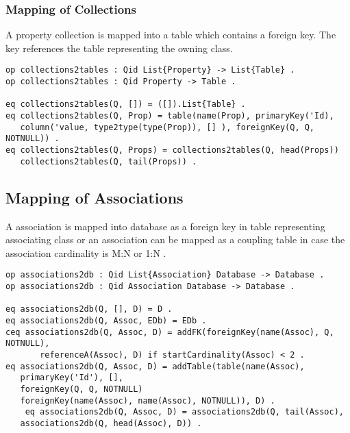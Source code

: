 \documentclass[11pt]{article}
\begin{document}
\subsubsection{Mapping of Collections}
A property collection is mapped into a table which contains a foreign key. The key references the table representing the owning class.
\begin{verbatim}
op collections2tables : Qid List{Property} -> List{Table} .
op collections2tables : Qid Property -> Table . 

eq collections2tables(Q, []) = ([]).List{Table} .
eq collections2tables(Q, Prop) = table(name(Prop), primaryKey('Id), 
   column('value, type2type(type(Prop)), [] ), foreignKey(Q, Q, NOTNULL)) .
eq collections2tables(Q, Props) = collections2tables(Q, head(Props)) 
   collections2tables(Q, tail(Props)) .
\end{verbatim}

\subsection{Mapping of Associations}
A association is mapped into database as a foreign key in table representing associating class or an association can be mapped as a coupling table in case the association cardinality is M:N or 1:N . 
\begin{verbatim}
op associations2db : Qid List{Association} Database -> Database .
op associations2db : Qid Association Database -> Database .
	
eq associations2db(Q, [], D) = D .
eq associations2db(Q, Assoc, EDb) = EDb .
ceq associations2db(Q, Assoc, D) = addFK(foreignKey(name(Assoc), Q, NOTNULL), 
	   referenceA(Assoc), D) if startCardinality(Assoc) < 2 . 
eq associations2db(Q, Assoc, D) = addTable(table(name(Assoc), 
   primaryKey('Id'), [], 
   foreignKey(Q, Q, NOTNULL) 
   foreignKey(name(Assoc), name(Assoc), NOTNULL)), D) .
	eq associations2db(Q, Assoc, D) = associations2db(Q, tail(Assoc), 
   associations2db(Q, head(Assoc), D)) .
\end{verbatim}



	
\end{document}

